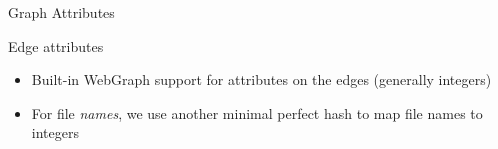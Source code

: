 \documentclass[aspectratio=169,xcolor=table]{beamer}
\begin{document}
\begin{frame}{Graph Attributes}
\begin{block}{Edge attributes}
\begin{itemize}
                \item Built-in WebGraph support for attributes on the \alert{edges} (generally integers)
                \item For file \emph{names}, we use another minimal perfect hash to map file names to integers
            \end{itemize}
        \end{block}
    \end{frame}
\end{document}
